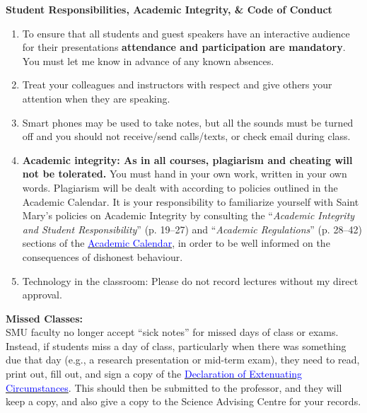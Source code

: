 \documentclass[hidelinks]{article}
\begin{document}
	\newpage
	\textbf{Student Responsibilities, Academic Integrity, \& Code of Conduct}
		\begin{enumerate}[topsep=0pt]
			\item To ensure that all students and guest speakers have an interactive audience for their presentations \textbf{attendance and participation are mandatory}. You must let me know in advance of any known absences.
			\item Treat your colleagues and instructors with respect and give others your attention when they are speaking.
			\item Smart phones may be used to take notes, but all the sounds must be turned off and you should not receive/send calls/texts, or check email during class.
			\item \textbf{Academic integrity: As in all courses, plagiarism and cheating will not be tolerated.} You must hand in your own work, written in your own words. Plagiarism will be dealt with according to policies outlined in the Academic Calendar. It is your responsibility to familiarize yourself with Saint Mary's policies on Academic Integrity by consulting the ``\emph{Academic Integrity and Student Responsibility}'' (p. 19--27) and ``\emph{Academic Regulations}'' (p. 28--42) sections of the \href{http://www.smu.ca/webfiles/UG%20calendar%202017-18%2024%20March%202017.pdf}{\textcolor{blue}{Academic Calendar}}, in order to be well informed on the consequences of dishonest behaviour.  
			\item Technology in the classroom: Please do not record lectures without my direct approval.
		\end{enumerate}

	\vspace{0.3cm}
 

	\textbf{Missed Classes:}\\
	SMU faculty no longer accept ``sick notes'' for missed days of class or exams. Instead, if students miss a day of class, particularly when there was something due that day (e.g., a research presentation or mid-term exam), they need to read, print out, fill out, and sign a copy of the \href{http://www.smu.ca/webfiles/Declaration_of_Extenuating_Circumstances_withinTerm.pdf}{\textcolor{blue}{Declaration of Extenuating Circumstances}}. This should then be submitted to the professor, and they will keep a copy, and also give a copy to the Science Advising Centre for your records. 
\end{document}
